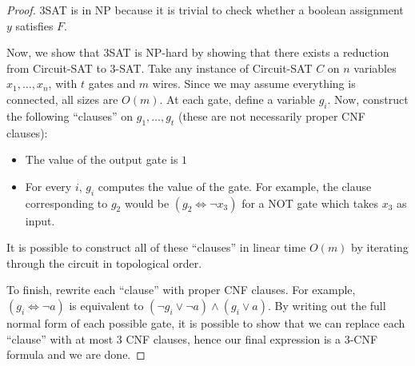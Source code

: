 \begin{proof}
$3$SAT is in NP because it is trivial to check whether a boolean assignment $y$ satisfies $F$. 

Now, we show that $3$SAT is NP-hard by showing that there exists a reduction from Circuit-SAT to $3$-SAT. Take any instance of Circuit-SAT $C$ on $n$ variables $x_1, \hdots, x_n$, with $t$ gates and $m$ wires. Since we may assume everything is connected, all sizes are $O(m)$. At each gate, define a variable $g_i$. Now, construct the following ``clauses'' on $g_1, \hdots, g_t$ (these are not necessarily proper CNF clauses):
\begin{itemize}
    \item The value of the output gate is $1$
    \item For every $i$, $g_i$ computes the value of the gate. For example, the clause corresponding to $g_2$ would be $(g_2\iff \neg x_3)$ for a NOT gate which takes $x_3$ as input. 
\end{itemize}
It is possible to construct all of these ``clauses'' in linear time $O(m)$ by iterating through the circuit in topological order. 

To finish, rewrite each ``clause'' with proper CNF clauses. For example, $(g_i\iff \neg a)$ is equivalent to $(\neg g_i\vee \neg a)\wedge (g_i\vee a)$. By writing out the full normal form of each possible gate, it is possible to show that we can replace each ``clause'' with at most $3$ CNF clauses, hence our final expression is a $3$-CNF formula and we are done.
\end{proof}

